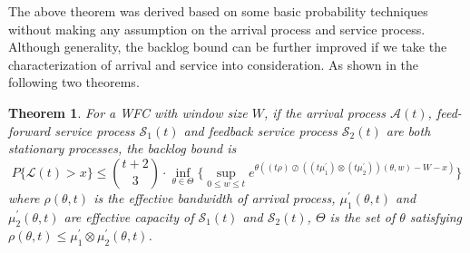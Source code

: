 \documentclass[12pt]{article}
\newtheorem{theorem}{Theorem}
\begin{document}
The above theorem was derived based on some basic probability techniques without making any assumption on the arrival process and service process. Although generality, the backlog bound can be further improved if we take the characterization of arrival and service into consideration. As shown in the following two theorems.
\begin{theorem}\label{theorem2}
For a WFC with window size $W$, if the arrival process $\mathcal{A}(t)$, feed-forward service process $\mathcal{S}_1(t)$ and feedback service process $\mathcal{S}_2(t)$ are both stationary processes, the backlog bound is
$$P\{\mathcal{L}(t)>x\}\leq {t+2\choose 3}\cdot \inf_{\theta\in\Theta}\{\sup_{0\leq w\leq t}e^{\theta((t\rho)\oslash((t\mu_1^\prime)\otimes(t\mu_2^\prime))(\theta,w)-W-x)}\}$$
where $\rho(\theta,t)$ is the effective bandwidth of arrival process, $\mu_1^\prime(\theta,t)$ and $\mu_2^\prime(\theta,t)$ are effective capacity of $\mathcal{S}_1(t)$ and $\mathcal{S}_2(t)$, $\Theta$ is the set of $\theta$ satisfying $\rho(\theta,t)\leq \mu_1^\prime\otimes\mu_2^\prime(\theta,t)$.
\end{theorem}
\end{document}
